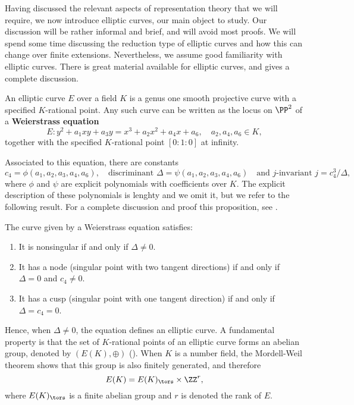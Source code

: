 
Having discussed the relevant aspects of representation theory that we will require, we now introduce elliptic curves, our main object to study. Our discussion will be rather informal and brief, and will avoid most proofs. We will spend some time discussing the reduction type of elliptic curves and how this can change over finite extensions. Nevertheless, we assume good familiarity with elliptic curves. There is great material available for elliptic curves, and \cite{S1} gives a complete discussion.

An elliptic curve $E$ over a field $K$ is a genus one smooth projective curve with a specified $K$-rational point. Any such curve can be written as the locus on $\PP^2$ of a \textbf{Weierstrass equation}
\begin{equation}\label{eqn_gen_elliptic}
    E: y^2+a_1xy+a_3y=x^3+a_2x^2+a_4x+a_6,\quad a_2,a_4,a_6\in K,
\end{equation}
together with the specified $K$-rational point $[0:1:0]$ at infinity.

Associated to this equation, there are constants
$$c_4=\phi(a_1,a_2,a_3,a_4,a_6),\quad\text{discriminant } \Delta=\psi(a_1,a_2,a_3,a_4,a_6)\quad \text{and $j$-invariant }j=c_4^3/\Delta,$$
where $\phi$ and $\psi$ are explicit polynomials with coefficients over $K$. 
The explicit description of these polynomials is lenghty and we omit it, but we refer to the following result. For a complete discussion and proof this proposition, see \cite[\S III.1]{S1}.

\begin{prop}\label{prop_nodecusp}
    The curve given by a Weierstrass equation satisfies:
    \begin{enumerate}
        \item It is nonsingular if and only if $\Delta\neq0$.
        \item It has a node (singular point with two tangent directions) if and only if $\Delta=0$ and $c_4 \neq 0$.
        \item It has a cusp (singular point with one tangent direction) if and only if $\Delta= c_4 = 0$. 
    \end{enumerate}
\end{prop}

Hence, when $\Delta\neq0$, the equation defines an elliptic curve. A fundamental property is that the set of $K$-rational points of an elliptic curve forms an abelian group, denoted by $(E(K),\oplus)$ (\cite[\S III.2]{S1}). When $K$ is a number field, the Mordell-Weil theorem shows that this group is also finitely generated, and therefore 
$$E(K)=E(K)_{\tors}\times\ZZ^r,$$
where $E(K)_{\tors}$ is a finite abelian group and $r$ is denoted the rank of $E$.
